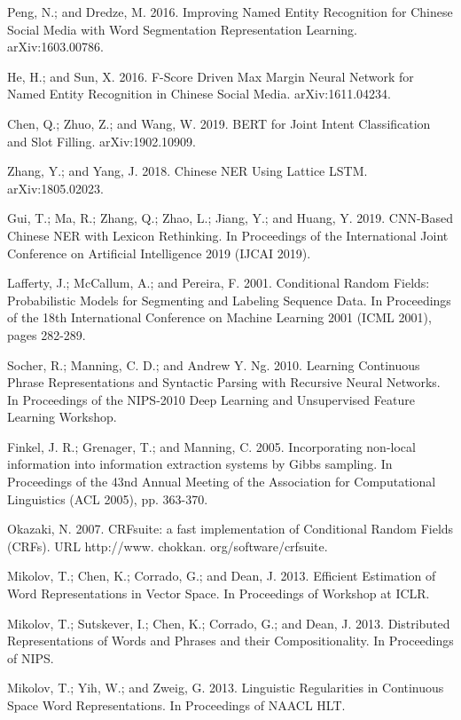 \documentclass[letterpaper]{article} %
\begin{document}
\smallskip \noindent
Peng, N.; and Dredze, M. 2016. Improving Named Entity Recognition for Chinese Social Media with Word Segmentation Representation Learning. arXiv:1603.00786. 

\smallskip \noindent
He, H.; and Sun, X. 2016. F-Score Driven Max Margin Neural Network for Named Entity Recognition in Chinese Social Media. 	arXiv:1611.04234. 

\smallskip \noindent
Chen, Q.; Zhuo, Z.; and Wang, W. 2019. BERT for Joint Intent Classification and Slot Filling. arXiv:1902.10909. 

\smallskip \noindent
Zhang, Y.; and Yang, J. 2018. Chinese NER Using Lattice LSTM. arXiv:1805.02023. 

\smallskip \noindent
Gui, T.; Ma, R.; Zhang, Q.; Zhao, L.; Jiang, Y.; and Huang, Y. 2019. CNN-Based Chinese NER with Lexicon Rethinking. In Proceedings of the International Joint Conference on Artificial Intelligence 2019 (IJCAI 2019). 

\smallskip \noindent
Lafferty, J.; McCallum, A.; and Pereira, F. 2001. Conditional Random Fields: Probabilistic Models for Segmenting and Labeling Sequence Data. In Proceedings of the 18th International Conference on Machine Learning 2001 (ICML 2001), pages 282-289.

\smallskip \noindent
Socher, R.; Manning, C. D.; and Andrew Y. Ng. 2010. Learning Continuous Phrase Representations and Syntactic Parsing with Recursive Neural Networks. In Proceedings of the NIPS-2010 Deep Learning and Unsupervised Feature Learning Workshop. 

\smallskip \noindent
Finkel, J. R.; Grenager, T.; and Manning, C. 2005. Incorporating non-local information into information extraction systems by Gibbs sampling. In Proceedings of the 43nd Annual Meeting of the Association for Computational Linguistics (ACL 2005), pp. 363-370. 

\smallskip \noindent
Okazaki, N. 2007. CRFsuite: a fast implementation of Conditional Random Fields (CRFs). URL http://www. chokkan. org/software/crfsuite. 

\smallskip \noindent
Mikolov, T.; Chen, K.; Corrado, G.; and Dean, J. 2013. Efficient Estimation of Word Representations in Vector Space. In Proceedings of Workshop at ICLR. 

\smallskip \noindent
Mikolov, T.; Sutskever, I.; Chen, K.; Corrado, G.; and Dean, J. 2013. Distributed Representations of Words and Phrases and their Compositionality. In Proceedings of NIPS. 

\smallskip \noindent
Mikolov, T.; Yih, W.; and Zweig, G. 2013. Linguistic Regularities in Continuous Space Word Representations. In Proceedings of NAACL HLT. 
\end{document}
